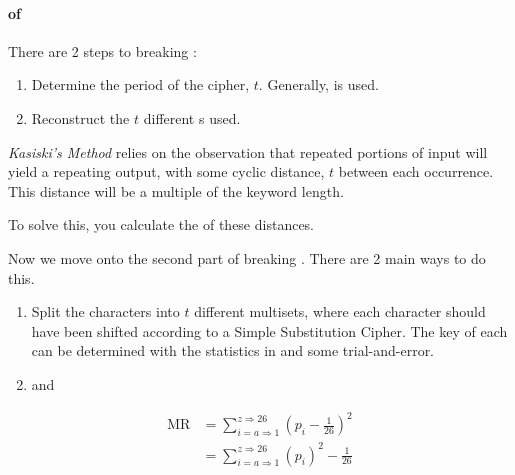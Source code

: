 \paragraph{ of }\label{par:Cryptanalysis_Vigenere_Cipher}
There are 2 steps to breaking :
\begin{enumerate}[noitemsep]
\item Determine the period of the cipher, $t$. Generally,  is used.
\item Reconstruct the $t$ different  s used.
\end{enumerate}

\begin{definition}\label{def:Kasiskis_Method}
  \emph{Kasiski's Method} relies on the observation that repeated portions of  input will yield a repeating  output, with some cyclic distance, $t$ between each occurrence.
  This distance will be a multiple of the keyword length.

  To solve this, you calculate the  of these distances.
\end{definition}

Now we move onto the second part of breaking .
There are 2 main ways to do this.
\begin{enumerate}[noitemsep]
\item Split the  characters into $t$ different multisets, where each character should have been shifted according to a Simple Substitution Cipher.
  The key of each  can be determined with the statistics in  and some trial-and-error.
\item {} and 
\end{enumerate}

\begin{definition}\label{def:Measure_of_Roughness}
  \begin{equation}\label{eq:Measure_of_Roughness}
    \begin{aligned}
      \mathrm{MR} &= \sum\limits_{i=a\Rightarrow1}^{z\Rightarrow26} {\left( p_{i} - \frac{1}{26} \right)}^{2} \\
      &= \sum\limits_{i=a\Rightarrow1}^{z\Rightarrow26} {\left( p_{i} \right)}^{2} - \frac{1}{26} \\
    \end{aligned}
  \end{equation}
\end{definition}

